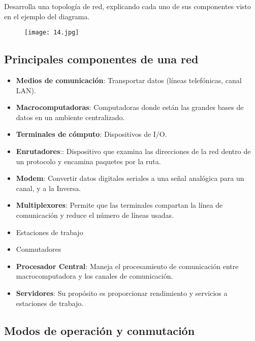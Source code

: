 {\raggedright
Desarrolla una topología de red, explicando cada uno de sus componentes visto en el ejemplo del diagrama.
}

\begin{figure}[h!]
		\centering
		{\texttt{[image: 14.jpg]}\par} \vspace{1cm}
\end{figure}

\begin{center}
\subsection{Principales componentes de una red}
\end{center}

\begin{itemize}
	\item \textbf{Medios de comunicación}: Transportar datos (líneas telefónicas, canal LAN).
	\item \textbf{Macrocomputadoras}: Computadoras donde están las grandes bases de datos en un ambiente centralizado.
	\item \textbf{Terminales de cómputo}: Dispositivos de I/O.
	\item \textbf{Enrutadores}:: Dispositivo que examina las direcciones de la red dentro de un protocolo y encamina paquetes por la ruta.
	\item \textbf{Modem}: Convertir datos digitales seriales a una señal analógica para un canal, y a la Inversa.
	\item \textbf{Multiplexores}: Permite que las terminales compartan la línea de comunicación y reduce el número de líneas usadas.
	\item Estaciones de trabajo
	\item Conmutadores
	\item \textbf{Procesador Central}: Maneja el procesamiento de comunicación entre macrocomputadora y los canales de comunicación.
	\item \textbf{Servidores}: Su propósito es proporcionar rendimiento y servicios a estaciones de trabajo.
\end{itemize}
\vspace{1cm}

\begin{center}
\subsection{Modos de operación y conmutación}
\end{center}

